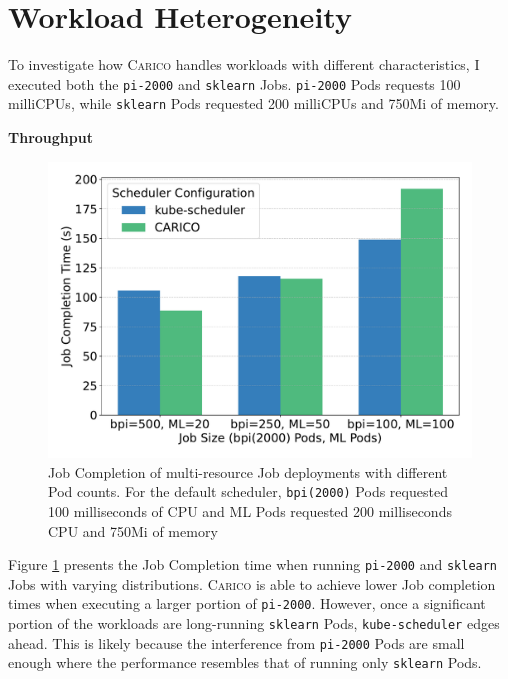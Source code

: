\section{Workload Heterogeneity}
\label{sec:eval-hetero}
To investigate how \textsc{Carico} handles workloads with different
characteristics, I executed both the \texttt{pi-2000} and \texttt{sklearn} Jobs.
\texttt{pi-2000} Pods requests 100 milliCPUs, while \texttt{sklearn} Pods
requested 200 milliCPUs and 750Mi of memory.

\textbf{Throughput}\\
\begin{figure}[ht!]
    \centering
    \includegraphics[width=\textwidth]{images/mixed-job-completion.pdf}
    \caption{Job Completion of multi-resource Job deployments with different Pod
    counts. For the default scheduler, \texttt{bpi(2000)} Pods requested 100
    milliseconds of CPU and ML Pods requested 200 milliseconds CPU and 750Mi of
    memory}
    \label{fig:mixed-throughput}
\end{figure}

Figure \ref{fig:mixed-throughput} presents the Job Completion time when running
\texttt{pi-2000} and \texttt{sklearn} Jobs with varying distributions.
\textsc{Carico} is able to achieve lower Job completion times when executing a
larger portion of \texttt{pi-2000}. However, once a significant portion of the
workloads are long-running \texttt{sklearn} Pods, \texttt{kube-scheduler} edges
ahead. This is likely because the interference from \texttt{pi-2000} Pods are
small enough where the performance resembles that of running only
\texttt{sklearn} Pods.

